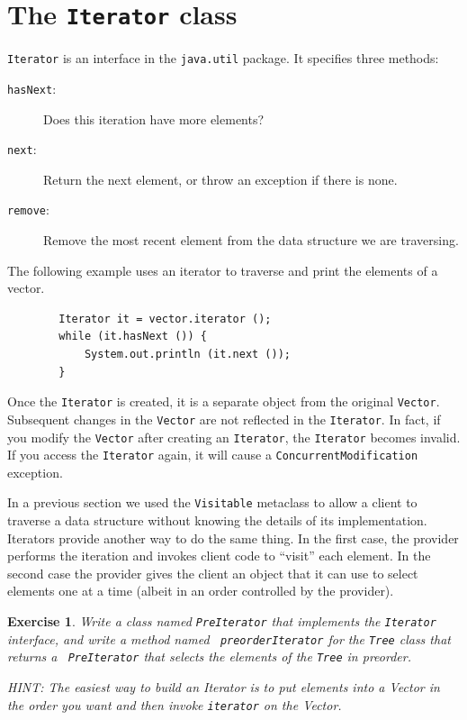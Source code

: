 \documentclass[12pt]{book}
\theoremstyle{exercise}
\newtheorem{exercise}{Exercise}[chapter]
\begin{document}
\section {The {\tt Iterator} class}
\label{iterator}

{\tt Iterator} is an interface in the {\tt java.util}
package.  It specifies three methods:

\begin{description}

\item [{\tt hasNext}:] Does this iteration have more elements?

\item [{\tt next}:] Return the next element, or throw an exception if
there is none.

\item [{\tt remove}:] Remove the most recent
element from the data structure we are traversing.

\end{description}

The following example uses an iterator to traverse and print the
elements of a vector.

\begin{verbatim}
        Iterator it = vector.iterator ();
        while (it.hasNext ()) {
            System.out.println (it.next ());
        }
\end{verbatim}
%
Once the {\tt Iterator} is created, it is a separate object from
the original {\tt Vector}.  Subsequent changes in the {\tt Vector}
are not reflected in the {\tt Iterator}.  In fact, if you
modify the {\tt Vector} after creating an {\tt Iterator},
the {\tt Iterator} becomes invalid.  If you access the
{\tt Iterator} again, it will cause a {\tt ConcurrentModification}
exception.


In a previous section we used the {\tt Visitable} metaclass to
allow a client to traverse a data structure without knowing the
details of its implementation.  Iterators provide another way to do
the same thing.  In the first case, the provider performs the iteration
and invokes client code to ``visit'' each element.  In the second
case the provider gives the client an object that it can use to
select elements one at a time (albeit in an order controlled by
the provider).

\begin{exercise}
Write a class named {\tt PreIterator} that
implements the {\tt Iterator} interface, and write a method named {\tt
preorderIterator} for the {\tt Tree} class that returns a {\tt
PreIterator} that selects the elements of the {\tt Tree} in preorder.

HINT: The easiest way to build an Iterator is to put elements
into a Vector in the order you want and then invoke {\tt iterator}
on the Vector.
\end{exercise}
\end{document}
